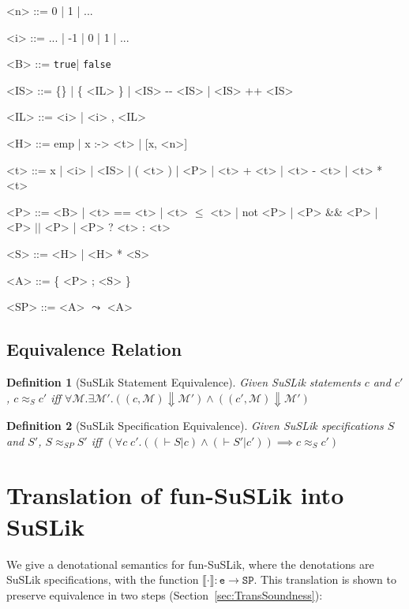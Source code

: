 \documentclass[10pt]{article}
\newtheorem{definition}{Definition}
\newcommand{\ttt}[1]{\texttt{#1}}
\newcommand{\ra}{\ensuremath{\rightarrow}}
\newcommand{\BigStep}{\ensuremath{\Downarrow}}
\newcommand{\true}{\ttt{true}}
\newcommand{\false}{\ttt{false}}
\newcommand{\sem} [1] {\llbracket#1\rrbracket}
\begin{document}
\begin{grammar}
  <n> ::= 0 | 1 | ...

  <i> ::= ... | -1 | 0 | 1 | ...

  <B> ::= \true | \false

  <IS> ::= \{\} | \{ <IL> \} | <IS> -{}- <IS> | <IS> ++ <IS>

  <IL> ::= <i> | <i> , <IL>

  <H> ::= emp | x :-> <t> | [x, <n>]

  <t> ::= x | <i> | <IS> | ( <t> ) | <P> | <t> + <t> | <t> - <t> | <t> * <t>

  <P> ::= <B> | <t> == <t> | <t> $\le$ <t> | not <P> | <P> \&\& <P> | <P> $||$ <P> | <P> ? <t> : <t>

  <S> ::= <H> | <H> * <S>

  <A> ::= \{ <P> ; <S> \}

  <SP> ::= <A> $\leadsto$ <A>
\end{grammar}

\subsection{Equivalence Relation}
\label{sec:SuSLikEquiv}

\begin{definition}[SuSLik Statement Equivalence]
  Given SuSLik statements $c$ and $c'$, $c \approx_S c'$ iff
    $\forall \mathcal{M}. \exists \mathcal{M'}.
      ((c, \mathcal{M}) \BigStep \mathcal{M'})
      \land
      ((c', \mathcal{M}) \BigStep \mathcal{M'})$
\end{definition}

\begin{definition}[SuSLik Specification Equivalence]
  Given SuSLik specifications $S$ and $S'$, $S \approx_{SP} S'$ iff
    $(\forall c\; c'. ((\vdash S | c) \land (\vdash S' | c')) \implies c \approx_{S} c')$
\end{definition}

\section{Translation of fun-SuSLik into SuSLik}
\label{sec:Translation}

We give a denotational semantics for fun-SuSLik, where the denotations are SuSLik specifications, with
the function $\sem{\cdot} : \ttt{e} \ra \ttt{SP}$.
This translation is shown to preserve equivalence in two steps (Section~\ref{sec:TransSoundness}):
\end{document}
